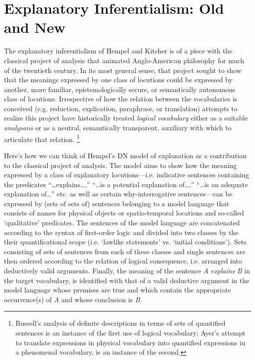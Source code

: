 \documentclass{article}
\date{}
\begin{document}
\setlength{\parindent}{1cm}
\doublespacing
\large

\section{Explanatory Inferentialism: Old and New}

The explanatory inferentialism of Hempel and Kitcher is of a piece with the classical project of analysis that animated Anglo-American philosophy for much of the twentieth century. In its most general sense, that project sought to show that the meanings expressed by one class of locutions could be expressed by another, more familiar, epistemologically secure, or semantically autonomous class of locutions. Irrespective of how the relation between the vocabularies is conceived (e.g. reduction, explication, paraphrase, or translation) attempts to realize this project have historically treated \textit{logical vocabulary} either as a suitable \textit{analysans} or as a neutral, semantically transparent, auxiliary with which to articulate that relation. \footnote{Russell's analysis of definite descriptions in terms of sets of quantified sentences is an instance of the first use of logical vocabulary; Ayer's attempt to translate expressions in physical vocabulary into quantified expressions in a phenomenal vocabulary, is an instance of the second.}

Here's how we can think of Hempel's DN model of explanation as a contribution to the classical project of analysis. The model aims to show how the meaning expressed by a class of explanatory locutions---i.e. indicative sentences containing the predicates ``\ldots explains\ldots,'' ``\ldots is a potential explanation of\ldots,'' ``\ldots is an adequate explanation of\ldots'' etc. as well as certain why-interrogative sentences---can be expressed by (sets of sets of) sentences belonging to a model language that consists of names for physical objects or spatio-temporal locations and so-called `qualitative' predicates. The sentences of the model language are concatenated according to the syntax of first-order logic and divided into two classes by the their quantificational scope (i.e. `lawlike statements' vs. `initial conditions'). Sets consisting of sets of sentences from each of these classes and single sentences are then ordered according to the relation of logical consequence, i.e. arranged into deductively valid arguments. Finally, the meaning of the sentence \textit{A explains B} in the target vocabulary, is identified with that of a valid deductive argument in the model language whose premises are true and which contain the appropriate occurrence(s) of \textit{A} and whose conclusion is \textit{B}.
\end{document}
